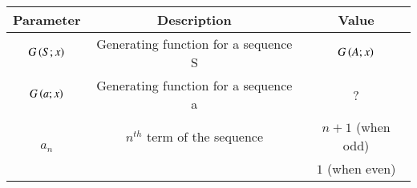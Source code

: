 \begin{tabular}{|c|c|c|}
   \hline
    \textbf{Parameter} & \textbf{Description} & \textbf{Value} \\
   \hline
    $G\left(S;x\right)$ & Generating function for a sequence S & $ G\left(A;x\right)$\\
   \hline
   $ G\left(a;x\right)$ & Generating function for a sequence a & ? \\
   \hline
   \multirow{2}{*}{$a_n$} & $n^{th}$ term of the sequence & $n+1$ (when odd) \\
   \cline{3-3}
   & & $1$ (when even) \\
   \hline
\end{tabular}
